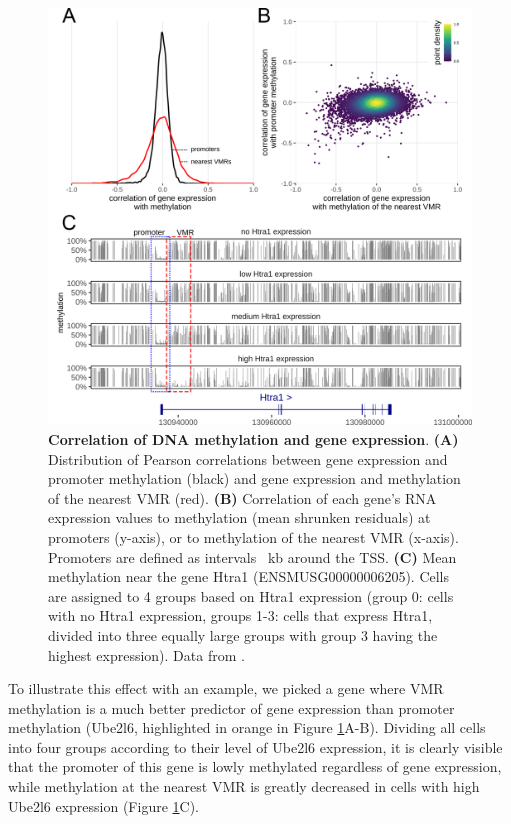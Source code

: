 \documentclass[twocolumn,10pt]{article}
\begin{document}
\begin{figure}
    \begin{center}
    \includegraphics[width=.95\columnwidth]{figures/Fig_correlation.png}
    \end{center}
    \caption{\small \textbf{Correlation of DNA methylation and gene expression}.
    \textbf{(A)} Distribution of Pearson correlations between gene expression and promoter methylation (black) and gene expression and methylation of the nearest VMR (red).
    \textbf{(B)} Correlation of each gene's RNA expression values to methylation (mean shrunken residuals) at promoters (y-axis), or to methylation of the nearest VMR (x-axis).
    Promoters are defined as intervals ~kb around the TSS.
    \textbf{(C)} Mean methylation near the gene Htra1 (ENSMUSG00000006205).
    Cells are assigned to 4 groups based on Htra1 expression (group 0: cells with no Htra1 expression, groups 1-3: cells that express Htra1, divided into three equally large groups with group 3 having the highest expression).
    Data from \citet{kremer_scnmt}.}
    \label{fig:correlation}
\end{figure}

To illustrate this effect with an example, we picked a gene where VMR methylation is a much better predictor of gene expression than promoter methylation (Ube2l6, highlighted in orange in Figure \ref{fig:correlation}A-B).
Dividing all cells into four groups according to their level of Ube2l6 expression, it is clearly visible that the promoter of this gene is lowly methylated regardless of gene expression, while methylation at the nearest VMR is greatly decreased in cells with high Ube2l6 expression (Figure \ref{fig:correlation}C).
\end{document}
